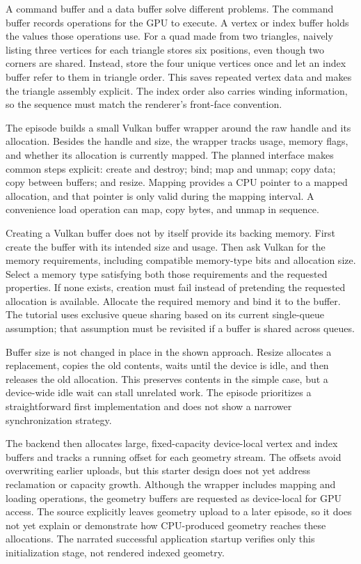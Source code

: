 \hypertarget{06-engine-ii-ch025-buffer-storage-reuse-and-the-first-backend-allocation}{}

A command buffer and a data buffer solve different problems. The command buffer records operations for the GPU to execute. A vertex or index buffer holds the values those operations use. For a quad made from two triangles, naively listing three vertices for each triangle stores six positions, even though two corners are shared. Instead, store the four unique vertices once and let an index buffer refer to them in triangle order. This saves repeated vertex data and makes the triangle assembly explicit. The index order also carries winding information, so the sequence must match the renderer's front-face convention.

The episode builds a small Vulkan buffer wrapper around the raw handle and its allocation. Besides the handle and size, the wrapper tracks usage, memory flags, and whether its allocation is currently mapped. The planned interface makes common steps explicit: create and destroy; bind; map and unmap; copy data; copy between buffers; and resize. Mapping provides a CPU pointer to a mapped allocation, and that pointer is only valid during the mapping interval. A convenience load operation can map, copy bytes, and unmap in sequence.

Creating a Vulkan buffer does not by itself provide its backing memory. First create the buffer with its intended size and usage. Then ask Vulkan for the memory requirements, including compatible memory-type bits and allocation size. Select a memory type satisfying both those requirements and the requested properties. If none exists, creation must fail instead of pretending the requested allocation is available. Allocate the required memory and bind it to the buffer. The tutorial uses exclusive queue sharing based on its current single-queue assumption; that assumption must be revisited if a buffer is shared across queues.

Buffer size is not changed in place in the shown approach. Resize allocates a replacement, copies the old contents, waits until the device is idle, and then releases the old allocation. This preserves contents in the simple case, but a device-wide idle wait can stall unrelated work. The episode prioritizes a straightforward first implementation and does not show a narrower synchronization strategy.

The backend then allocates large, fixed-capacity device-local vertex and index buffers and tracks a running offset for each geometry stream. The offsets avoid overwriting earlier uploads, but this starter design does not yet address reclamation or capacity growth. Although the wrapper includes mapping and loading operations, the geometry buffers are requested as device-local for GPU access. The source explicitly leaves geometry upload to a later episode, so it does not yet explain or demonstrate how CPU-produced geometry reaches these allocations. The narrated successful application startup verifies only this initialization stage, not rendered indexed geometry.

